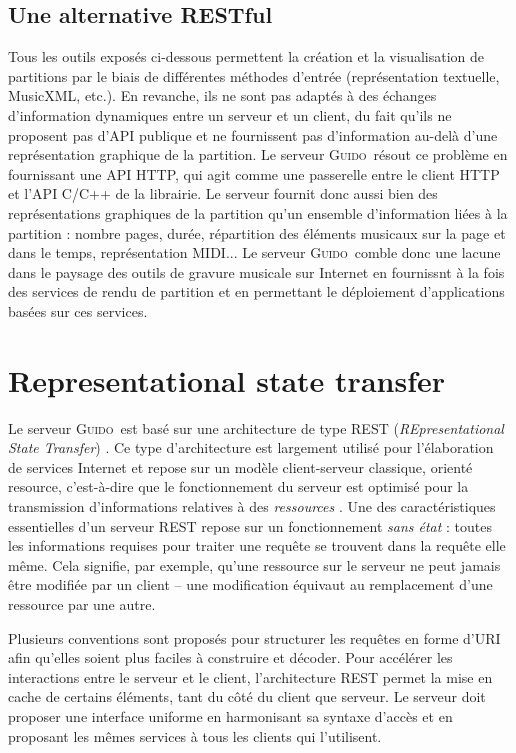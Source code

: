 \documentclass{article}
\newcommand{\guido}		{\textsc{Guido}}
\begin{document}
\subsection{Une alternative RESTful}\label{subsection:restful}
Tous les outils exposés ci-dessous permettent la création et la visualisation de partitions par le biais de différentes méthodes d'entrée (représentation textuelle, MusicXML, etc.). En revanche, ils ne sont pas adaptés à des échanges d'information dynamiques entre un serveur et un client, du fait qu'ils ne proposent pas d'API publique et ne fournissent pas d'information au-delà d'une représentation graphique de la partition. Le serveur \guido\ résout ce problème en fournissant une API HTTP, qui agit comme une passerelle entre le client HTTP et l'API C/C++ de la librairie. Le serveur fournit donc aussi bien des représentations graphiques de la partition qu'un ensemble d'information liées à la partition : nombre pages, durée, répartition des éléments musicaux sur la page et dans le temps, représentation MIDI...
Le serveur \guido\ comble donc une lacune dans le paysage des outils de gravure musicale sur Internet en fournissnt à la fois des services de rendu de partition et en permettant le déploiement d'applications basées sur ces services.

\section{Representational state transfer}\label{section:rest}

Le serveur \guido\ est basé sur une architecture de type REST (\emph{REpresentational State Transfer}) \cite{Fielding00}. Ce type d'architecture est largement utilisé pour l'élaboration de services Internet et repose sur un modèle client-serveur classique, \og{}orienté resource\fg{}, c'est-à-dire que le fonctionnement du serveur est optimisé pour la transmission d'informations relatives à des \emph{ressources} \cite{richardson2008restful}. Une des caractéristiques essentielles d'un serveur REST repose sur un fonctionnement \emph{sans état} : toutes les informations requises pour traiter une requête se trouvent dans la requête elle même. Cela signifie, par exemple, qu'une ressource sur le serveur ne peut jamais être modifiée par un client -- une modification équivaut au remplacement d'une ressource par une autre. 

Plusieurs conventions sont proposés pour structurer les requêtes en forme d'URI afin qu'elles soient plus faciles à construire et décoder. Pour accélérer les interactions entre le serveur et le client, l'architecture REST permet la mise en cache de certains éléments, tant du côté du client que serveur. Le serveur doit proposer une interface uniforme en harmonisant sa syntaxe d'accès et en proposant les mêmes services à tous les clients qui l'utilisent.
\end{document}

